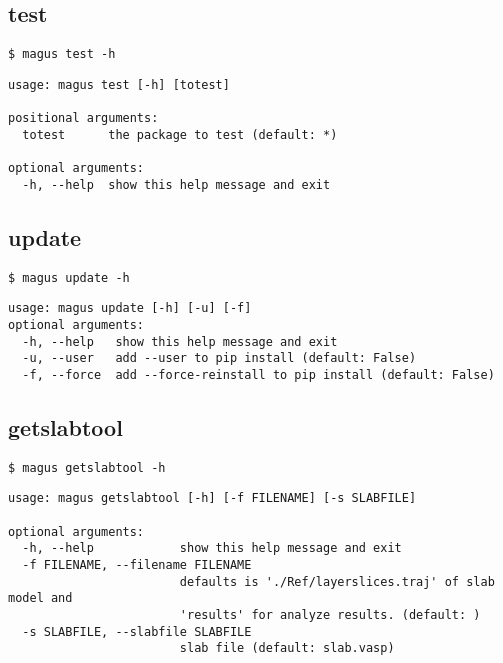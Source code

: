 \documentclass[12pt,oneside]{book}
\begin{document}
\subsection{test}
\begin{tcolorbox}
    \begin{verbatim}
$ magus test -h
    \end{verbatim}
    \tcblower
    \begin{verbatim}
usage: magus test [-h] [totest]

positional arguments:
  totest      the package to test (default: *)

optional arguments:
  -h, --help  show this help message and exit
    \end{verbatim}
\end{tcolorbox}

\subsection{update}
\begin{tcolorbox}
    \begin{verbatim}
$ magus update -h
    \end{verbatim}
    \tcblower
    \begin{verbatim}
usage: magus update [-h] [-u] [-f]
optional arguments:
  -h, --help   show this help message and exit
  -u, --user   add --user to pip install (default: False)
  -f, --force  add --force-reinstall to pip install (default: False)
    \end{verbatim}
\end{tcolorbox}

\subsection{getslabtool}
    \begin{tcolorbox}
\begin{verbatim}
$ magus getslabtool -h
    \end{verbatim}
    \tcblower
    \begin{verbatim}
usage: magus getslabtool [-h] [-f FILENAME] [-s SLABFILE]

optional arguments:
  -h, --help            show this help message and exit
  -f FILENAME, --filename FILENAME
                        defaults is './Ref/layerslices.traj' of slab model and
                        'results' for analyze results. (default: )
  -s SLABFILE, --slabfile SLABFILE
                        slab file (default: slab.vasp)
    \end{verbatim}
\end{tcolorbox}
\end{document}

